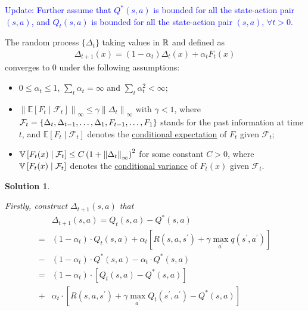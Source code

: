 \documentclass{article}
\newtheorem*{Solution}{Solution}
\newcommand{\mytextcolor}[1]{\textcolor{blue}{{}#1}}
\begin{document}
\begin{enumerate}
\begin{enumerate}
    \mytextcolor{Update: Further assume that $Q^\ast(s,a)$ is bounded for all the state-action pair $(s,a)$, and $Q_t(s,a)$ is bounded for all the state-action pair $(s,a)$, $\forall t>0$.}
    \begin{lemma}
        The random process $\{\Delta_t\}$ taking values in ${\mathbb{R}}$ and defined as
        \begin{align*}
            \Delta_{t+1}(x)=\left(1-\alpha_{t}\right) \Delta_{t}(x)+\alpha_{t} F_{t}(x)
        \end{align*}
        converges to $0$ under the following assumptions:
        \begin{itemize}
            \item $0\leq\alpha_{t}\leq1$, $\sum_{t} \alpha_{t}=\infty$ and $\sum_{t} \alpha^2_{t}<\infty$;
            \item $\left\|\mathbb{E}\left[F_{t} \mid \mathcal{F}_{t}\right]\right\|_{\infty} \leq \gamma\left\|\Delta_{t}\right\|_{\infty}$ with $\gamma<1$, where ${\mathcal{F}}_t=\{\Delta_t,\Delta_{t-1},\ldots,\Delta_1,F_{t-1},\ldots,F_1\}$ stands for the past information at time $t$, and $\mathbb{E}\left[F_{t} \mid \mathcal{F}_{t}\right]$ denotes the \href{https://en.wikipedia.org/wiki/Conditional_expectation}{conditional expectation} of $F_{t}$ given $\mathcal{F}_{t}$;
            \item ${\mathbb{V}}\left[F_{t}(x) \mid \mathcal{F}_{t}\right] \leq C\left(1+\left\|\Delta_{t}\right\|_{\infty}\right)^2$ for some constant $C>0$, where ${\mathbb{V}}\left[F_{t}(x) \mid \mathcal{F}_{t}\right]$ denotes the \href{https://en.wikipedia.org/wiki/Conditional_variance}{conditional variance} of $F_{t}(x)$ given $\mathcal{F}_{t}$.
        \end{itemize}
    \end{lemma}
    \begin{Solution}~\par
    Firstly, construct $\Delta_{t+1}(s,a)$ that
    \begin{equation}
    \begin{aligned}
        &\Delta_{t+1}(s,a)=Q_t(s,a)-Q^\ast(s,a)\\
        =&(1-\alpha_t)\cdot Q_t(s,a)+\alpha_t\left[R\left(s, a, s^{\prime}\right)+\gamma\max_{a^\prime} q\left(s^{\prime},a^{\prime}\right)\right]\\
        -&(1-\alpha_t)\cdot Q^\ast(s,a)-\alpha_t\cdot Q^\ast(s,a)\\
        =&(1-\alpha_t)\cdot\left[Q_t(s,a)-Q^\ast(s,a)\right]\\+&\alpha_t\cdot \left[R\left(s, a, s^{\prime}\right)+\gamma\max_{a^\prime} Q_t\left(s^{\prime},a^{\prime}\right)-Q^\ast(s,a)\right]\\

\end{aligned}
\end{equation}
\end{Solution}
\end{enumerate}
\end{enumerate}
\end{document}
